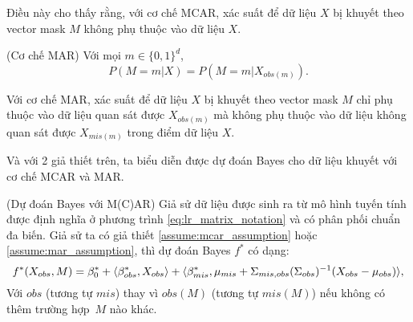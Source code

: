 Điều này cho thấy rằng, với cơ chế MCAR, xác suất để dữ liệu $X$ bị khuyết theo vector mask $M$ không phụ thuộc vào dữ liệu $X$. 

\begin{assume}\label{assume:mar_assumption} (Cơ chế MAR)
Với mọi $m \in \{0, 1\}^d$,
    \begin{equation*}
        P(M = m | X) = P(M = m | X_{obs(m)}).
    \end{equation*}
\end{assume}

Với cơ chế MAR, xác suất để dữ liệu $X$ bị khuyết theo vector mask $M$ chỉ phụ thuộc vào dữ liệu quan sát được $X_{obs(m)}$ mà không phụ thuộc vào dữ liệu không quan sát được $X_{mis(m)}$ trong điểm dữ liệu $X$.

Và với 2 giả thiết trên, ta biểu diễn được dự đoán Bayes cho dữ liệu khuyết với cơ chế MCAR và MAR.

\begin{prop}\label{prop:mcar_bayes_predictor} (Dự đoán Bayes với M(C)AR)
Giả sử dữ liệu được sinh ra từ mô hình tuyến tính được định nghĩa ở phương trình \eqref{eq:lr_matrix_notation} và có phân phối chuẩn đa biến. Giả sử ta có giả thiết \ref{assume:mcar_assumption} hoặc \ref{assume:mar_assumption}, thì dự đoán Bayes $f^*$ có dạng:
    \begin{equation}\label{eq:mcar_bayes_predictor}
        f^* (X_{obs},M ) =
        \beta_{0}^{*} + \langle\beta_{obs}^{*},X_{obs} \rangle+\langle\beta_{mis}^{*},\mu_{mis} + \Sigma_{mis,obs}(\Sigma_{obs})^{-1}(X_{obs}-\mu_{obs})\rangle,
    \end{equation}
    Với $obs$ (tương tự $mis$) thay vì $obs(M)$ (tương tự $mis(M)$) nếu không có thêm trường hợp~$M$ nào khác.
\end{prop}


